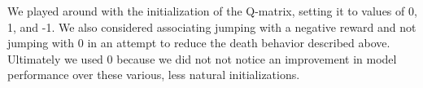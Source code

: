 \documentclass[11pt]{article}
\begin{document}
We played around with the initialization of the Q-matrix, setting it to values of 0, 1, and -1. We also considered associating jumping with a negative reward and not jumping with 0 in an attempt to reduce the death behavior described above. Ultimately we used 0 because we did not not notice an improvement in model performance over these various, less natural initializations.
\end{document}
